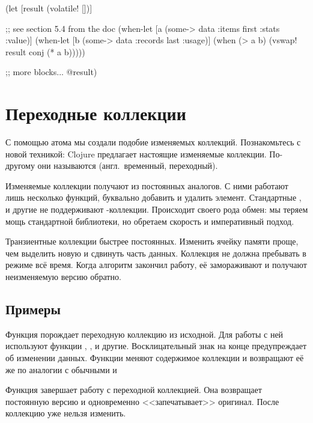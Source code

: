 \else

\begin{clojure}
(let [result (volatile! [])]

  ;; see section 5.4 from the doc
  (when-let [a (some-> data :items first :stats :value)]
    (when-let [b (some-> data :records last :usage)]
      (when (> a b)
        (vswap! result conj (* a b)))))

  ;; more blocks...
  @result)
\end{clojure}

\fi

\section{Переходные коллекции}


С помощью атома мы создали подобие изменяемых коллекций. Познакомьтесь с новой
техникой: Clojure предлагает настоящие изменяемые коллекции. По-другому
они называются  (англ.~временный, переходный).

Изменяемые коллекции получают из постоянных аналогов. С ними работают лишь
несколько функций, буквально добавить и удалить элемент. Стандартные ,
 и другие не поддерживают -коллекции. Происходит
своего рода обмен: мы теряем мощь стандартной библиотеки, но обретаем скорость и
императивный подход.

Транзиентные коллекции быстрее постоянных. Изменить ячейку памяти проще, чем
выделить новую и сдвинуть часть данных. Коллекция не должна пребывать в режиме
 всё время. Когда алгоритм закончил работу, её
замораживают и получают неизменяемую версию обратно.

\subsection{Примеры}

Функция  порождает переходную коллекцию из исходной. Для работы
с ней используют функции , ,  и
другие. Восклицательный знак на конце предупреждает об изменении данных. Функции
меняют содержимое коллекции и возвращают её же по аналогии с обычными
 и 


Функция  завершает работу с переходной коллекцией. Она
возвращает постоянную версию и одновременно <<запечатывает>> оригинал. После
 коллекцию уже нельзя изменить.

